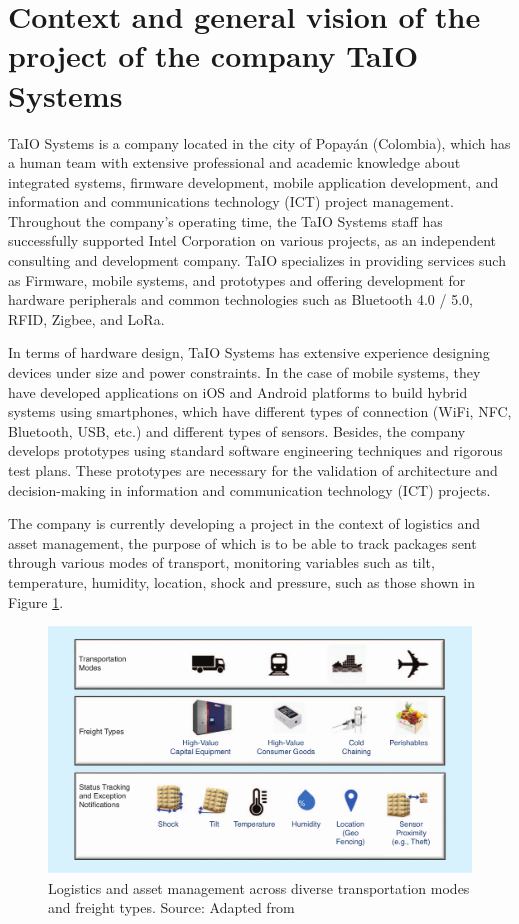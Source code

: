 \documentclass[journal]{IEEEtran}	%
\begin{document}
\section{Context and general vision of the project of the company TaIO Systems}
TaIO Systems is a company located in the city of Popayán (Colombia), which has a human team with extensive professional and academic knowledge about integrated systems, firmware development, mobile application development, and information and communications technology (ICT) project management. Throughout the company's operating time, the TaIO Systems staff has successfully supported Intel Corporation on various projects, as an independent consulting and development company. TaIO specializes in providing services such as Firmware, mobile systems, and prototypes and offering development for hardware peripherals and common technologies such as Bluetooth 4.0 / 5.0, RFID, Zigbee, and LoRa.

In terms of hardware design, TaIO Systems has extensive experience designing devices under size and power constraints. In the case of mobile systems, they have developed applications on iOS and Android platforms to build hybrid systems using smartphones, which have different types of connection (WiFi, NFC, Bluetooth, USB, etc.) and different types of sensors. Besides, the company develops prototypes using standard software engineering techniques and rigorous test plans. These prototypes are necessary for the validation of architecture and decision-making in information and communication technology (ICT) projects.

The company is currently developing a project in the context of logistics and asset management, the purpose of which is to be able to track packages sent through various modes of transport, monitoring variables such as tilt, temperature, humidity, location, shock and pressure, such as those shown in Figure \ref{fig:logistic1}.

\begin{figure}[t]
\centering
\includegraphics[width=1.0\columnwidth]{fig1.png}
\caption{Logistics and asset management across diverse transportation modes and freight types. Source: Adapted from \cite{williams2017weaving}}
\label{fig:logistic1}
\end{figure}
\end{document}
